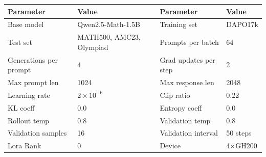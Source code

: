 \documentclass{article}
\theoremstyle{plain}
\theoremstyle{definition}
\theoremstyle{remark}
\begin{document}
\begin{table}[h]
  \centering
  \label{tab:config-1.5b}
  \begin{tcolorbox}[
    enhanced, hbox,
    title={Training setup of Qwen2.5-Math-1.5B},
    colback=teal!5, colframe=teal, coltext=black, coltitle=white,
    fonttitle=\bfseries, arc=1mm, boxrule=1pt, boxsep=1pt,
    left=2pt, right=2pt, top=0pt, bottom=2pt,
    toptitle=3pt, bottomtitle=3pt, center
  ]
    \small
    \renewcommand{\arraystretch}{1.2}
    \setlength{\tabcolsep}{8pt}
    \begin{tabular}{l|l|l|l}
      \textbf{Parameter} & \textbf{Value} & \textbf{Parameter} & \textbf{Value} \\
      \hline
      Base model & Qwen2.5-Math-1.5B & Training set & DAPO17k \\
      Test set & MATH500, AMC23, Olympiad & Prompts per batch & 64 \\
      Generations per prompt & 4 & Grad updates per step & 2 \\
      Max prompt len & 1024 & Max response len & 2048 \\
      Learning rate & $2 \times 10^{-6}$ & Clip ratio & 0.22 \\
      KL coeff & 0.0 & Entropy coeff & 0.0 \\
      Rollout temp & 0.8 & Validation temp & 0.8 \\
      Validation samples & 16 & Validation interval & 50 steps \\
      Lora Rank & 0 & Device & 4$\times$GH200 \\
    \end{tabular}
  \end{tcolorbox}
\end{table}
\end{document}
